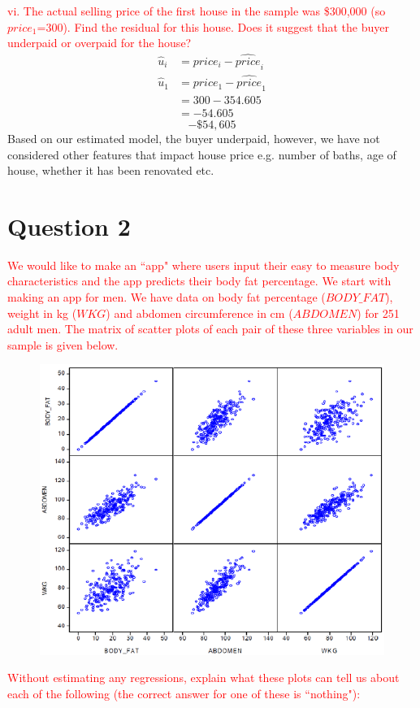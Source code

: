 \documentclass[12pt]{report}
\begin{document}
\noindent \textcolor{red}
{
	vi. The actual selling price of the first house in the sample was \$300,000 (so $price_1$=300). Find the residual for this house. Does it suggest that the buyer underpaid or overpaid for the house?
}
\begin{align*}
\hat{u}_i &= price_i - \widehat{price}_i \\
\hat{u}_1 &= price_1 - \widehat{price}_1 \\
&= 300 - 354.605 \\
&= -54.605
\end{align*}
$$-\$54,605$$
\noindent Based on our estimated model, the buyer underpaid, however, we have not considered other features that impact house price e.g. number of baths, age of house, whether it has been renovated etc.

\newpage
\section*{Question 2}
\noindent \textcolor{red}{We would like to make an ``app" where users input their easy to measure body characteristics and the app predicts their body fat percentage. We start with making an app for men. We have data on body fat percentage ($BODY\_FAT$), weight in kg ($WKG$) and abdomen circumference in cm ($ABDOMEN$) for 251 adult men. The matrix of scatter plots of each pair of these three variables in our sample is given below.}
\begin{figure}[H]
	\centering
	\includegraphics{tute5_28}
\end{figure}
\noindent \textcolor{red}{Without estimating any regressions, explain what these plots can tell us about each of the following (the correct answer for one of these is ``nothing"):}
\end{document}
